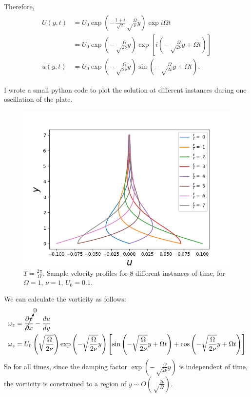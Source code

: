 \documentclass{article}
\begin{document}
Therefore,
\begin{align}\label{eq:flat_plate_soln}
 \begin{split}
  U(y, t) &= U_{0} \exp{\left(-\frac{1 + i}{\sqrt{2}} \sqrt\frac{\Omega}{\nu}  y \right)} \exp{i\Omega t}\\
  &= U_{0} \exp{\left(- \sqrt\frac{\Omega}{2\nu}  y \right)} \exp{\left[i\left(-\sqrt\frac{\Omega}{2\nu}  y  + \Omega t\right)\right]}\\
  u(y, t) &=  U_{0} \exp{\left(- \sqrt\frac{\Omega}{2\nu}  y \right)} \sin{\left(- \sqrt\frac{\Omega}{2\nu}  y  + \Omega t\right)}.
 \end{split}
\end{align}

I wrote a small python code to plot the solution at different instances during one oscillation of the plate. 

\begin{figure}[H]
    \centering
    \includegraphics[scale = 0.8]{Figs/u_vs_y_diff_t.png}
    \caption{$T= \frac{2 \pi}{\Omega}$. Sample velocity profiles for $8$ different instances of time, for $\Omega = 1$, $\nu = 1$, $U_{0} = 0.1$.}
    \label{fig:oscillating_plate_soln}
\end{figure}

We can calculate the vorticity as follows:
\begin{align}
 \begin{split}
  \omega_{z} & = \cancelto{0}{\frac{\partial v}{\partial x}}-\frac{du}{dy} \\
  \omega_{z} &= U_{0}\left( \sqrt\frac{\Omega}{2\nu}  \right) \exp{\left(- \sqrt\frac{\Omega}{2\nu}  y \right)} \left[ \sin{\left(- \sqrt\frac{\Omega}{2\nu}  y  + \Omega t\right)} + \cos{\left(- \sqrt\frac{\Omega}{2\nu}  y  + \Omega t\right)}\right]
  \end{split}
\end{align}
So for all times, since the damping factor $\exp{\left(- \sqrt\frac{\Omega}{2\nu}  y \right)}$ is independent of time, the vorticity is constrained to a region of $y \sim O\left( \sqrt\frac{2\nu}{\Omega}\right)$.
\end{document}
